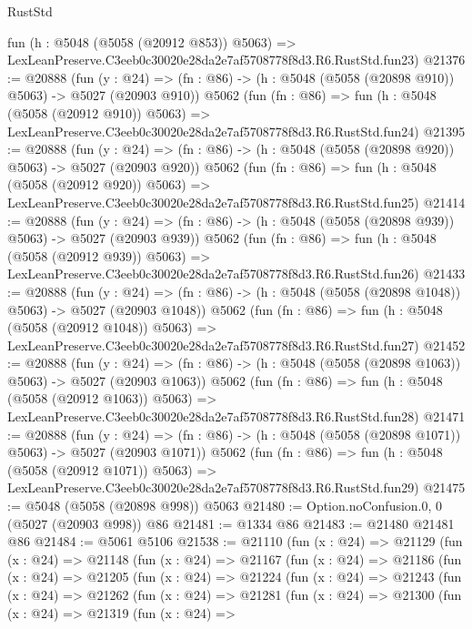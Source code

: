\begin{lexlean}{RustStd}
\begin{coremodule}
    fun (h : @5048 (@5058 (@20912 @853)) @5063) =>
    LexLeanPreserve.C3eeb0c30020e28da2e7af5708778f8d3.R6.RustStd.fun23)
@21376 := @20888
    (fun (y : @24) => (fn : @86) -> (h : @5048 (@5058 (@20898 @910)) @5063) -> @5027 (@20903 @910))
    @5062
    (fun (fn : @86) =>
    fun (h : @5048 (@5058 (@20912 @910)) @5063) =>
    LexLeanPreserve.C3eeb0c30020e28da2e7af5708778f8d3.R6.RustStd.fun24)
@21395 := @20888
    (fun (y : @24) => (fn : @86) -> (h : @5048 (@5058 (@20898 @920)) @5063) -> @5027 (@20903 @920))
    @5062
    (fun (fn : @86) =>
    fun (h : @5048 (@5058 (@20912 @920)) @5063) =>
    LexLeanPreserve.C3eeb0c30020e28da2e7af5708778f8d3.R6.RustStd.fun25)
@21414 := @20888
    (fun (y : @24) => (fn : @86) -> (h : @5048 (@5058 (@20898 @939)) @5063) -> @5027 (@20903 @939))
    @5062
    (fun (fn : @86) =>
    fun (h : @5048 (@5058 (@20912 @939)) @5063) =>
    LexLeanPreserve.C3eeb0c30020e28da2e7af5708778f8d3.R6.RustStd.fun26)
@21433 := @20888
    (fun (y : @24) =>
    (fn : @86) -> (h : @5048 (@5058 (@20898 @1048)) @5063) -> @5027 (@20903 @1048))
    @5062
    (fun (fn : @86) =>
    fun (h : @5048 (@5058 (@20912 @1048)) @5063) =>
    LexLeanPreserve.C3eeb0c30020e28da2e7af5708778f8d3.R6.RustStd.fun27)
@21452 := @20888
    (fun (y : @24) =>
    (fn : @86) -> (h : @5048 (@5058 (@20898 @1063)) @5063) -> @5027 (@20903 @1063))
    @5062
    (fun (fn : @86) =>
    fun (h : @5048 (@5058 (@20912 @1063)) @5063) =>
    LexLeanPreserve.C3eeb0c30020e28da2e7af5708778f8d3.R6.RustStd.fun28)
@21471 := @20888
    (fun (y : @24) =>
    (fn : @86) -> (h : @5048 (@5058 (@20898 @1071)) @5063) -> @5027 (@20903 @1071))
    @5062
    (fun (fn : @86) =>
    fun (h : @5048 (@5058 (@20912 @1071)) @5063) =>
    LexLeanPreserve.C3eeb0c30020e28da2e7af5708778f8d3.R6.RustStd.fun29)
@21475 := @5048 (@5058 (@20898 @998)) @5063
@21480 := Option.noConfusion.{0, 0} (@5027 (@20903 @998)) @86
@21481 := @1334 @86
@21483 := @21480 @21481 @86
@21484 := @5061 @5106
@21538 := @21110
    (fun (x : @24) =>
    @21129
      (fun (x : @24) =>
      @21148
        (fun (x : @24) =>
        @21167
          (fun (x : @24) =>
          @21186
            (fun (x : @24) =>
            @21205
              (fun (x : @24) =>
              @21224
                (fun (x : @24) =>
                @21243
                  (fun (x : @24) =>
                  @21262
                    (fun (x : @24) =>
                    @21281
                      (fun (x : @24) =>
                      @21300
                        (fun (x : @24) =>
                        @21319
                          (fun (x : @24) =>

\end{coremodule}
\end{lexlean}
